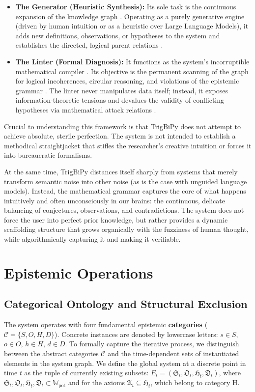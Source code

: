\documentclass[11pt, a4paper]{article}
\begin{document}
	\begin{itemize}
		\item \textbf{The Generator (Heuristic Synthesis):} Its sole task is the continuous expansion of the knowledge graph \cite{246, 248}. Operating as a purely generative engine (driven by human intuition or as a heuristic over Large Language Models), it adds new definitions, observations, or hypotheses to the system and establishes the directed, logical parent relations \cite{247, 324, 435}.
		\item \textbf{The Linter (Formal Diagnosis):} It functions as the system's incorruptible mathematical compiler \cite{238, 249}. Its objective is the permanent scanning of the graph for logical incoherences, circular reasoning, and violations of the epistemic grammar \cite{249, 250}. The linter never manipulates data itself; instead, it exposes information-theoretic tensions and devalues the validity of conflicting hypotheses via mathematical attack relations \cite{238, 251, 323, 387, 388}.
	\end{itemize}
	
	Crucial to understanding this framework is that TrigBiPy does not attempt to achieve absolute, sterile perfection. The system is not intended to establish a methodical straightjacket that stifles the researcher's creative intuition or forces it into bureaucratic formalisms.
	
	At the same time, TrigBiPy distances itself sharply from systems that merely transform semantic noise into other noise (as is the case with unguided language models). Instead, the mathematical grammar captures the core of what happens intuitively and often unconsciously in our brains: the continuous, delicate balancing of conjectures, observations, and contradictions. The system does not force the user into perfect prior knowledge, but rather provides a dynamic scaffolding structure that grows organically with the fuzziness of human thought, while algorithmically capturing it and making it verifiable.
	
	\section{Epistemic Operations}
	
	\subsection{Categorical Ontology and Structural Exclusion}
	The system operates with four fundamental epistemic \textbf{categories} ($\mathcal{C} = \{S, O, H, D\}$). Concrete instances are denoted by lowercase letters: $s \in S$, $o \in O$, $h \in H$, $d \in D$.
	To formally capture the iterative process, we distinguish between the abstract categories $\mathcal{C}$ and the time-dependent sets of instantiated elements in the system graph. We define the global system at a discrete point in time $t$ as the tuple of currently existing subsets: $E_t = (\mathfrak{S}_t, \mathfrak{O}_t, \mathfrak{H}_t, \mathfrak{D}_t)$, where $\mathfrak{S}_t, \mathfrak{O}_t, \mathfrak{H}_t, \mathfrak{D}_t \subset \mathbb{W}_{\text{pot}}$ and for the axioms $\mathfrak{A}_t \subseteq \mathfrak{H}_t$, which belong to category H.
	
\end{document}
